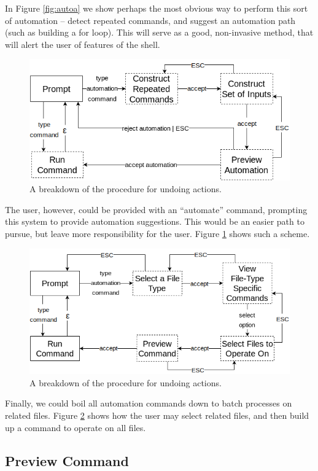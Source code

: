 In Figure \ref{fig:autoa} we show perhaps the most obvious way to perform this
sort of automation \--- detect repeated commands, and suggest an automation path
(such as building a for loop). This will serve as a good, non-invasive method,
that will alert the user of features of the shell.

\begin{figure}[H]
  \centering
  \includegraphics[width=0.8\linewidth]{figures/alternatives/automate_b.png}
  \caption{A breakdown of the procedure for undoing actions.}
  \label{fig:autob}
\end{figure}

The user, however, could be provided with an ``automate'' command, prompting
this system to provide automation suggestions. This would be an easier path to
pursue, but leave more responsibility for the user. Figure \ref{fig:autob} shows
such a scheme.

\begin{figure}[H]
  \centering
  \includegraphics[width=0.8\linewidth]{figures/alternatives/automate_c.png}
  \caption{A breakdown of the procedure for undoing actions.}
  \label{fig:autoc}
\end{figure}

Finally, we could boil all automation commands down to batch processes on
related files. Figure \ref{fig:autoc} shows how the user may select related files,
and then build up a command to operate on all files.

\subsection{Preview Command}

